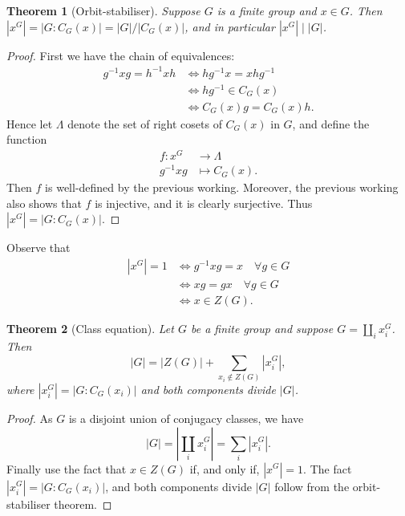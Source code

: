 \documentclass[11pt, notitlepage]{article}
\numberwithin{equation}{section}
\theoremstyle{plain}
\newtheorem{theorem}{Theorem}[section]
\theoremstyle{definition}
\newcommand{\abs}[1]{\left\lvert#1\right\rvert}
\begin{document}
\begin{theorem}[Orbit-stabiliser]
Suppose $G$ is a finite group and $x \in G$. Then $|x^G| = |G:C_G(x)| = |G|/|C_G(x)|$, and in particular $|x^G| \mid |G|$.
\end{theorem}

\begin{proof}
First we have the chain of equivalences:
\begin{align*}
    g^{-1}xg = h^{-1}xh &\iff hg^{-1}x = xhg^{-1}\\
    &\iff hg^{-1} \in C_G(x)\\
    &\iff C_G(x)g = C_G(x)h.
\end{align*}
Hence let $\Lambda$ denote the set of right cosets of $C_G(x)$ in $G$, and define the function
\begin{align*}
    f : x^G &\to \Lambda\\
    g^{-1}xg &\mapsto C_G(x).
\end{align*}
Then $f$ is well-defined by the previous working. Moreover, the previous working also shows that $f$ is injective, and it is clearly surjective. Thus $|x^G| = |G : C_G(x)|$.
\end{proof}

Observe that
\begin{align*}
    |x^G| = 1 &\iff g^{-1}xg = x \quad \forall g \in G\\
    &\iff xg = gx \quad \forall g \in G\\
    &\iff x \in Z(G).
\end{align*}


\begin{theorem}[Class equation]
Let $G$ be a finite group and suppose $G = \coprod_i x_i^G$. Then
\[
    |G| = |Z(G)| + \sum_{x_i \notin Z(G)} |x_i^G|,
\]
where $|x_i^G| = |G : C_G(x_i)|$ and both components divide $|G|$.
\end{theorem}

\begin{proof}
As $G$ is a disjoint union of conjugacy classes, we have
\[
    |G| = \abs{\coprod_i x_i^G} = \sum_i |x_i^G|.
\]
Finally use the fact that $x \in Z(G)$ if, and only if, $|x^G| = 1$. The fact $|x_i^G| = |G : C_G(x_i)|$, and both components divide $|G|$ follow from the orbit-stabiliser theorem. 
\end{proof}










\end{document}
